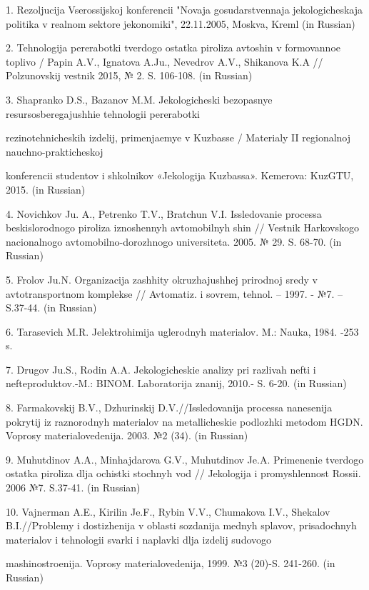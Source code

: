 \begin{noparindent}
1. Rezoljucija Vserossijskoj konferencii "Novaja gosudarstvennaja
jekologicheskaja politika v real\textquotesingle nom sektore
jekonomiki", 22.11.2005, Moskva, Kreml\textquotesingle{} (in Russian)

2. Tehnologija pererabotki tverdogo ostatka piroliza avtoshin v
formovannoe toplivo / Papin A.V., Ignatova A.Ju., Nevedrov A.V.,
Shikanova K.A // Polzunovskij vestnik 2015, № 2. S. 106-108. (in
Russian)

3. Shapranko D.S., Bazanov M.M. Jekologicheski bezopasnye
resursosberegajushhie tehnologii pererabotki

rezinotehnicheskih izdelij,
primenjaemye v Kuzbasse / Materialy II regional\textquotesingle noj
nauchno-prakticheskoj

konferencii studentov i
shkol\textquotesingle nikov «Jekologija Kuzbassa». Kemerova: KuzGTU,
2015. (in Russian)

4. Novichkov Ju. A., Petrenko T.V., Bratchun V.I. Issledovanie processa
beskislorodnogo piroliza iznoshennyh avtomobil\textquotesingle nyh shin
// Vestnik Har\textquotesingle kovskogo nacional\textquotesingle nogo
avtomobil\textquotesingle no-dorozhnogo universiteta. 2005. № 29. S.
68-70. (in Russian)

5. Frolov Ju.N. Organizacija zashhity okruzhajushhej prirodnoj sredy v
avtotransportnom komplekse // Avtomatiz. i sovrem, tehnol. -- 1997. -
№7. -- S.37-44. (in Russian)

6. Tarasevich M.R. Jelektrohimija uglerodnyh materialov. M.: Nauka,
1984. -253 s.

7. Drugov Ju.S., Rodin A.A. Jekologicheskie analizy pri razlivah nefti i
nefteproduktov.-M.: BINOM. Laboratorija znanij, 2010.- S. 6-20. (in
Russian)

8. Farmakovskij B.V., Dzhurinskij D.V.//Issledovanija processa
nanesenija pokrytij iz raznorodnyh materialov na metallicheskie
podlozhki metodom HGDN. Voprosy materialovedenija. 2003. №2 (34). (in
Russian)

9. Muhutdinov A.A., Minhajdarova G.V., Muhutdinov Je.A. Primenenie
tverdogo ostatka piroliza dlja ochistki stochnyh vod // Jekologija i
promyshlennost\textquotesingle{} Rossii. 2006 №7. S.37-41. (in Russian)

10. Vajnerman A.E., Kirilin Je.F., Rybin V.V., Chumakova I.V., Shekalov
B.I.//Problemy i dostizhenija v oblasti sozdanija mednyh splavov,
prisadochnyh materialov i tehnologii svarki i naplavki dlja izdelij
sudovogo

mashinostroenija. Voprosy materialovedenija, 1999. №3 (20)-S.
241-260. (in Russian)
\end{noparindent}

